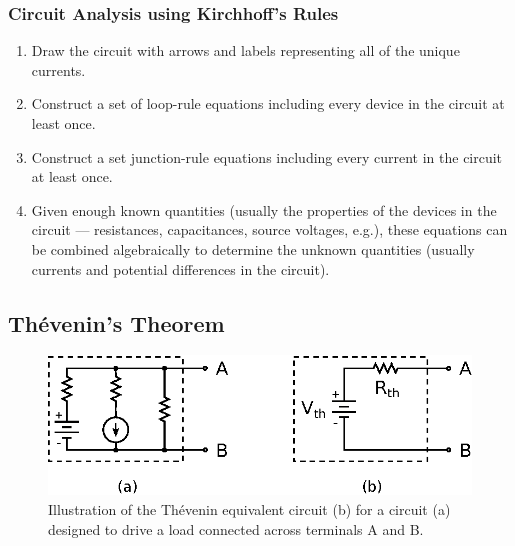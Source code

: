 \documentclass[11pt]{article}
\begin{document}
\subsubsection*{Circuit Analysis using Kirchhoff's Rules}
\begin{enumerate}
\item Draw the circuit with arrows and labels representing all of the
  unique currents.
 
\item Construct a set of loop-rule equations including every device in
  the circuit at least once.

\item Construct a set junction-rule equations including every current
  in the circuit at least once.

\item Given enough known quantities (usually the properties of the
  devices in the circuit --- resistances, capacitances, source
  voltages, e.g.), these equations can be combined algebraically to
  determine the unknown quantities (usually currents and potential
  differences in the circuit).
\end{enumerate}
\begin{latexonly}
  \noindent
  \hrulefill
\end{latexonly}
\htmlrule


\subsection{Th\'{e}venin's Theorem}
\label{sec:thevenin}
           
\begin{figure}[ht]
  \begin{center}
     \includegraphics{thevenin.eps}
    \caption{Illustration of the Th\'{e}venin equivalent circuit (b)
      for a circuit (a) designed to drive a load connected across
      terminals A and B.}
    \label{fig:thevenin}
  \end{center}
\end{figure}
\end{document}
